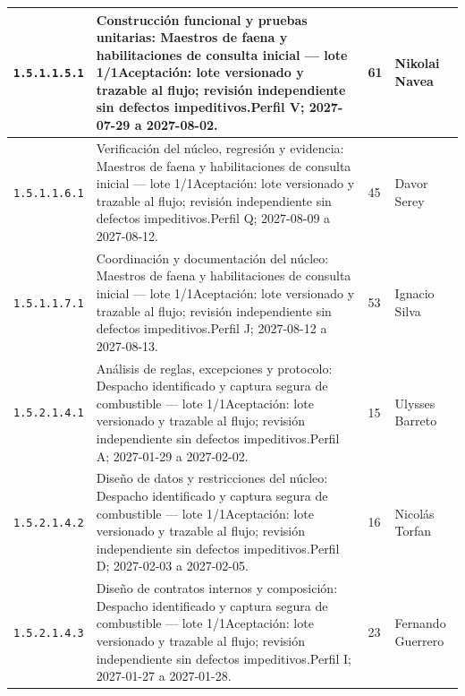 \begin{longtable}{L{29mm}L{80mm}R{12mm}L{28mm}}
\texttt{1.\allowbreak{}5.\allowbreak{}1.\allowbreak{}1.\allowbreak{}5.\allowbreak{}1} & Construcción funcional y pruebas unitarias: Maestros de faena y habilitaciones de consulta inicial — lote 1/1\newline Aceptación: lote versionado y trazable al flujo; revisión independiente sin defectos impeditivos.\newline Perfil V; 2027-07-29 a 2027-08-02. & 61 & Nikolai Navea\\\hline
\texttt{1.\allowbreak{}5.\allowbreak{}1.\allowbreak{}1.\allowbreak{}6.\allowbreak{}1} & Verificación del núcleo, regresión y evidencia: Maestros de faena y habilitaciones de consulta inicial — lote 1/1\newline Aceptación: lote versionado y trazable al flujo; revisión independiente sin defectos impeditivos.\newline Perfil Q; 2027-08-09 a 2027-08-12. & 45 & Davor Serey\\\hline
\texttt{1.\allowbreak{}5.\allowbreak{}1.\allowbreak{}1.\allowbreak{}7.\allowbreak{}1} & Coordinación y documentación del núcleo: Maestros de faena y habilitaciones de consulta inicial — lote 1/1\newline Aceptación: lote versionado y trazable al flujo; revisión independiente sin defectos impeditivos.\newline Perfil J; 2027-08-12 a 2027-08-13. & 53 & Ignacio Silva\\\hline
\texttt{1.\allowbreak{}5.\allowbreak{}2.\allowbreak{}1.\allowbreak{}4.\allowbreak{}1} & Análisis de reglas, excepciones y protocolo: Despacho identificado y captura segura de combustible — lote 1/1\newline Aceptación: lote versionado y trazable al flujo; revisión independiente sin defectos impeditivos.\newline Perfil A; 2027-01-29 a 2027-02-02. & 15 & Ulysses Barreto\\\hline
\texttt{1.\allowbreak{}5.\allowbreak{}2.\allowbreak{}1.\allowbreak{}4.\allowbreak{}2} & Diseño de datos y restricciones del núcleo: Despacho identificado y captura segura de combustible — lote 1/1\newline Aceptación: lote versionado y trazable al flujo; revisión independiente sin defectos impeditivos.\newline Perfil D; 2027-02-03 a 2027-02-05. & 16 & Nicolás Torfan\\\hline
\texttt{1.\allowbreak{}5.\allowbreak{}2.\allowbreak{}1.\allowbreak{}4.\allowbreak{}3} & Diseño de contratos internos y composición: Despacho identificado y captura segura de combustible — lote 1/1\newline Aceptación: lote versionado y trazable al flujo; revisión independiente sin defectos impeditivos.\newline Perfil I; 2027-01-27 a 2027-01-28. & 23 & Fernando Guerrero\\\hline

\end{longtable}
